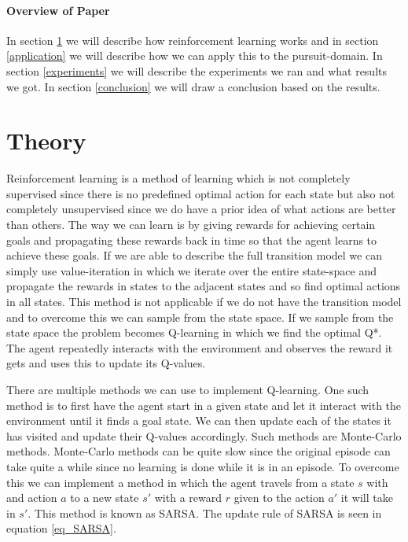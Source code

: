 \documentclass[10pt]{article}
\begin{document}
\paragraph{Overview of Paper}
In section \ref{theory} we will describe how reinforcement learning works and in section \ref{application} we will describe how we can apply this to the pursuit-domain. In section \ref{experiments} we will describe the experiments we ran and what results we got. In section \ref{conclusion} we will draw a conclusion based on the results.


\section{Theory}\label{theory}
Reinforcement learning is a method of learning which is not completely supervised since there is no predefined optimal action for each state but also not completely unsupervised since we do have a prior idea of what actions are better than others. The way we can learn is by giving rewards for achieving certain goals and propagating these rewards back in time so that the agent learns to achieve these goals. If we are able to describe the full transition model we can simply use value-iteration in which we iterate over the entire state-space and propagate the rewards in states to the adjacent states and so find optimal actions in all states. This method is not applicable if we do not have the transition model and to overcome this we can sample from the state space. If we sample from the state space the problem becomes Q-learning in which we find the optimal Q*. The agent repeatedly interacts with the environment and observes the reward it gets and uses this to update its Q-values.

There are multiple methods we can use to implement Q-learning. One such method is to first have the agent start in a given state and let it interact with the environment until it finds a goal state. We can then update each of the states it has visited and update their Q-values accordingly. Such methods are Monte-Carlo methods. Monte-Carlo methods can be quite slow since the original episode can take quite a while since no learning is done while it is in an episode. To overcome this we can implement a method in which the agent travels from a state $s$ with and action $a$ to a new state $s'$ with a reward $r$ given to the action $a'$ it will take in $s'$. This method is known as SARSA. The update rule of SARSA is seen in equation \ref{eq_SARSA}.
\end{document}
